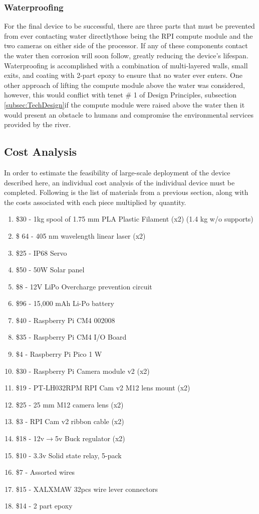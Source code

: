 \documentclass[fleqn,10pt]{SelfArx} %
\begin{document}
	\subsubsection{Waterproofing}
	For the final device to be successful, there are three parts that must be prevented from ever contacting water directly\textemdash those being the \gls{RPI} compute module and the two cameras on either side of the processor. If any of these components contact the water then corrosion will soon follow, greatly reducing the device’s lifespan. Waterproofing is accomplished with a combination of multi-layered walls, small exits, and coating with 2-part epoxy to ensure that no water ever enters. One other approach of lifting the compute module above the water was considered, however, this would conflict with tenet \# 1 of Design Principles, subsection \ref{subsec:TechDesign}\textemdash if the compute module were raised above the water then it would present an obstacle to humans and compromise the environmental services provided by the river. 
	\subsection{Cost Analysis}
	
	In order to estimate the feasibility of large-scale deployment of the device described here, an individual cost analysis of the individual device must be completed. Following is the list of materials from a previous section, along with the costs associated with each piece multiplied by quantity.
	
	\begin{enumerate}
		
		\item \$30 - 1kg spool of 1.75 mm PLA Plastic Filament (x2) (1.4 kg w/o supports)
		\item \$ 64 - 405 nm wavelength linear laser (x2)
		\item \$25 - IP68 Servo
		\item \$50 - 50W Solar panel
		\item \$8 - 12V LiPo Overcharge prevention circuit
		\item \$96 - 15,000 mAh Li-Po battery
		\item \$40 - Raspberry Pi CM4 002008
		\item \$35 - Raspberry Pi CM4 I/O Board
		\item \$4 - Raspberry Pi Pico 1 W
		\item \$30 - Raspberry Pi Camera module v2 (x2)
		\item \$19 - PT-LH032RPM \gls{RPI} Cam v2 M12 lens mount (x2)
		\item \$25 - 25 mm M12 camera lens (x2)
		\item \$3 - \gls{RPI} Cam v2 ribbon cable (x2)
		\item \$18 - 12v$\rightarrow$5v Buck regulator (x2)
		\item \$10 - 3.3v Solid state relay, 5-pack
		\item \$7 - Assorted wires
		\item \$15 - XALXMAW 32pcs wire lever connectors
		\item \$14 - 2 part epoxy 
	\end{enumerate}
	
\end{document}
